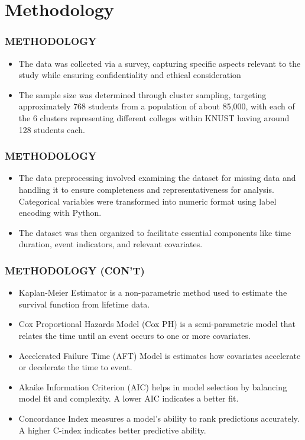 \documentclass{beamer}
\begin{document}
	\section{Methodology}
	
	
	
	\begin{frame}
		\frametitle{METHODOLOGY}
		\begin{itemize}
			\item 
			The data was collected via a survey, capturing specific aspects relevant to the study while ensuring confidentiality and ethical consideration
			\item The sample size was determined through cluster sampling, targeting approximately 768 students from a population of about 85,000, with each of the 6 clusters representing different colleges within KNUST having around 128 students each.
			
			
		\end{itemize}
	\end{frame}
	
	\begin{frame}
		\frametitle{METHODOLOGY}
		\begin{itemize}
			\item The data preprocessing involved examining the dataset for missing data and handling it to ensure completeness and representativeness for analysis. Categorical variables were transformed into numeric format using label encoding with Python.
			\item The dataset was then organized to facilitate essential components like time duration, event indicators, and relevant covariates.
			
		\end{itemize}
	\end{frame}
	
	\begin{frame}
		\frametitle{METHODOLOGY (CON'T)}
		\begin{itemize}
			\item Kaplan-Meier Estimator is a
			non-parametric method used to estimate the survival function from lifetime data.
			\item Cox Proportional Hazards Model (Cox PH) is a semi-parametric model that relates the time until an event occurs to one or more covariates.
			\item Accelerated Failure Time (AFT) Model is estimates how covariates accelerate or decelerate the time to event.
			\item Akaike Information Criterion (AIC) helps in model selection by balancing model fit and complexity. A lower AIC indicates a better fit. 
			\item Concordance Index measures a model's ability to rank predictions accurately. A higher C-index indicates better predictive ability.
		\end{itemize}
	\end{frame}
	
\end{document}

